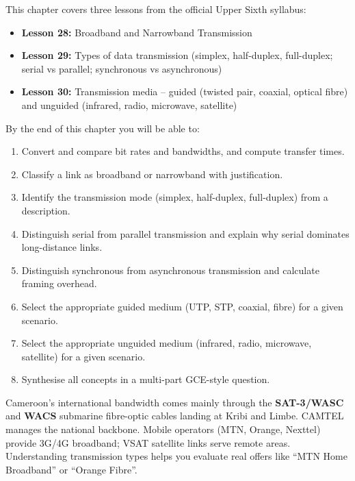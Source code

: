 \documentclass[11pt]{article}
\begin{document}
\begin{aretenir}
This chapter covers three lessons from the official Upper Sixth syllabus:
\begin{itemize}
\item \textbf{Lesson 28:} Broadband and Narrowband Transmission
\item \textbf{Lesson 29:} Types of data transmission (simplex, half-duplex, full-duplex; serial vs parallel; synchronous vs asynchronous)
\item \textbf{Lesson 30:} Transmission media -- guided (twisted pair, coaxial, optical fibre) and unguided (infrared, radio, microwave, satellite)
\end{itemize}
By the end of this chapter you will be able to:
\begin{enumerate}
\item Convert and compare bit rates and bandwidths, and compute transfer times.
\item Classify a link as broadband or narrowband with justification.
\item Identify the transmission mode (simplex, half-duplex, full-duplex) from a description.
\item Distinguish serial from parallel transmission and explain why serial dominates long-distance links.
\item Distinguish synchronous from asynchronous transmission and calculate framing overhead.
\item Select the appropriate guided medium (UTP, STP, coaxial, fibre) for a given scenario.
\item Select the appropriate unguided medium (infrared, radio, microwave, satellite) for a given scenario.
\item Synthesise all concepts in a multi-part GCE-style question.
\end{enumerate}
\end{aretenir}

\begin{savaistu}
Cameroon's international bandwidth comes mainly through the \textbf{SAT-3/WASC} and \textbf{WACS} submarine fibre-optic cables landing at Kribi and Limbe. CAMTEL manages the national backbone. Mobile operators (MTN, Orange, Nexttel) provide 3G/4G broadband; VSAT satellite links serve remote areas. Understanding transmission types helps you evaluate real offers like ``MTN Home Broadband'' or ``Orange Fibre''.
\end{savaistu}
\end{document}
